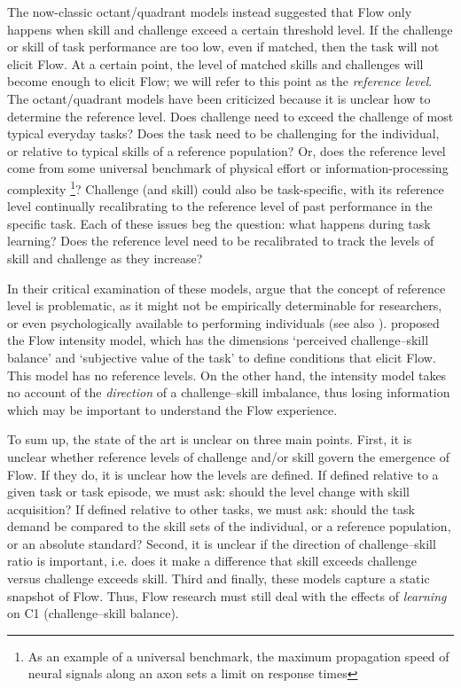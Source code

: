 \documentclass{frontierstyle/frontiersSCNS}
\newcommand{\hl}{\textcolor{red!80}}
\begin{document}
The now-classic octant/quadrant models \citep{Massimini1988} instead suggested that Flow only happens when skill and challenge exceed a certain threshold level. \hl{If the challenge or skill of task performance are too low, even if matched, then the task will not elicit Flow. At a certain point, the level of matched skills and challenges will become enough to elicit Flow; we will refer to this point as the {\it reference level}. The octant/quadrant models have been criticized because it is unclear how to determine the reference level. Does challenge need to exceed the challenge of most typical everyday tasks? Does the task need to be challenging for the individual, or relative to typical skills of a reference population? Or, does the reference level come from some universal benchmark of physical effort or information-processing complexity \footnote{As an example of a universal benchmark, the maximum propagation speed of neural signals along an axon sets a limit on response times}? Challenge (and skill) could also be task-specific, with its reference level continually recalibrating to the reference level of past performance in the specific task. Each of these issues beg the question:} what happens during task learning? Does the reference level need to be recalibrated to track the levels of skill and challenge as they increase?

In their critical examination of these models, \cite{Keller2012} argue that \hl{the concept of reference level is problematic, as it} might not be empirically determinable for researchers, or even psychologically available to performing individuals (see also \cite{Moneta2012}). \hl{\citet[pp-56]{Keller2012} proposed the Flow intensity model, which has the dimensions `perceived challenge--skill balance' and `subjective value of the task' to define conditions that elicit Flow. This model has no reference levels. On the other hand, the intensity model takes no account of the {\it direction} of a challenge--skill imbalance, thus losing information which may be important to understand the Flow experience.}

\hl{To sum up, the state of the art is unclear on three main points. First, it is unclear whether reference levels of challenge and/or skill govern the emergence of Flow. If they do, it is unclear how the levels are defined. If defined relative to a given task or task episode, we must ask: should the level change with skill acquisition? If defined relative to other tasks, we must ask: should the task demand be compared to the skill sets of the individual, or a reference population, or an absolute standard? Second, it is unclear if the direction of challenge--skill ratio is important, i.e. does it make a difference that skill exceeds challenge versus challenge exceeds skill. Third and finally, these models capture a static snapshot of Flow. Thus, Flow research must still deal with the effects of \textit{learning} on {\sf C1} (challenge--skill balance).}
\end{document}
